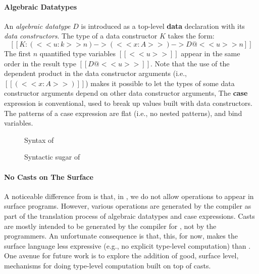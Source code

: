 \paragraph{Algebraic Datatypes}
An \emph{algebraic datatype} $D$ is introduced as a top-level
\textbf{data} declaration with its \emph{data constructors}. The type
of a data constructor $K$ takes the form:
\[
[[K : (<<u:k>>n) -> (<<x : A>>) -> D@<<u>>n]]
\]
The first $n$ quantified type variables $[[<<u>>]]$ appear in the same
order in the result type $[[D@<<u>>]]$.  Note that the use of the
dependent product in the data constructor arguments (i.e.,
$[[(<<x:A>>)]]$) makes it possible to let the types of some data
constructor arguments depend on other data constructor arguments,
The \textbf{case} expression is conventional, used to break up values
built with data constructors.  The patterns of a case expression are
flat (i.e., no nested patterns), and bind variables.

{
\renewcommand{\arraystretch}{0.9}
\begin{figure}
\resizebox{\columnwidth}{!}{\gram{\ottpgm\ottinterrule
\ottdecl\ottinterrule
\ottu\ottinterrule
\ottp\ottinterrule
\ottE\ottinterrule
\ottGs}}
\caption{Syntax of \sufcc}
\label{fig:surface:syntax}
\end{figure}

\begin{figure}
\resizebox{\columnwidth}{!}{$\ottsurfsugar$} %
\caption{Syntactic sugar of \sufcc}
\label{fig:surface:sugar}
\end{figure}
}

\paragraph{No Casts on The Surface}
A noticeable difference from \name is that, in \sufcc, we do not allow
\cast operations to appear in surface programs. However, various \cast
operations are generated by the compiler as part of the translation
process of algebraic datatypes and case expressions. 
Casts are mostly intended to be generated by the compiler for \sufcc, not
by the programmers. An unfortunate consequence is that, this, for now,
makes the surface language less expressive (e.g., no explicit
type-level computation) than \name. One avenue for future work is to
explore the addition of good, surface level, mechanisms for doing
type-level computation built on top of casts.

